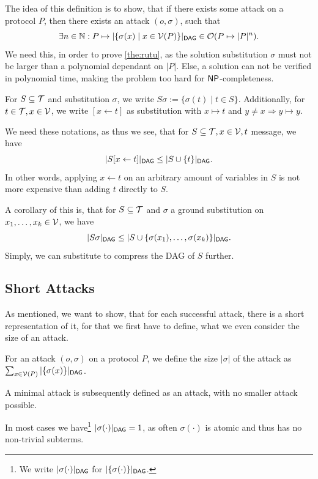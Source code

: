 The idea of this definition is to show, that if there exists some attack on a protocol \(P\), then there exists an attack \((o, \sigma)\), such that
\[\exists n \in \mathbb N : P \mapsto |\{\sigma(x) \mid x \in \mathcal{V}(P)\}|_{\textsf{DAG}} \in \mathcal O(P \mapsto |P|^n).\]
We need this, in order to prove \cref{the:rutu}, as the solution substitution \(\sigma\) must not be larger than a polynomial dependant on \(|P|\).
Else, a solution can not be verified in polynomial time, making the problem too hard for \(\textsf{NP}\)-completeness.

\begin{definition}
    For \(S \subseteq \mathcal{T}\) and substitution \(\sigma\), we write \(S\sigma := \{\sigma(t) \mid t \in S\}\).
    Additionally, for \(t \in \mathcal{T}, x \in \mathcal{V}\), we write \([x \leftarrow t]\) as substitution with \(x \mapsto t\) and \(y \ne x \Rightarrow y \mapsto y\).
\end{definition}

We need these notations, as thus we see, that for \(S \subseteq \mathcal{T}, x \in \mathcal{V}, t\) message, we have
\[|S[x \leftarrow t]|_{\textsf{DAG}} \le |S \cup \{t\}|_{\textsf{DAG}}.\]
In other words, applying \(x \leftarrow t\) on an arbitrary amount of variables in \(S\) is not more expensive than adding \(t\) directly to \(S\).

A corollary of this is, that for \(S \subseteq \mathcal{T}\) and \(\sigma\) a ground substitution on \(x_1, \dots, x_k \in \mathcal{V}\), we have
\[|S\sigma|_{\textsf{DAG}} \le |S \cup \{\sigma(x_1), \dots, \sigma(x_k)\}|_{\textsf{DAG}}.\]
Simply, we can substitute to compress the DAG of \(S\) further.

\subsection{Short Attacks}
As mentioned, we want to show, that for each successful attack, there is a short representation of it, for that we first have to define, what we even consider the size of an attack.

\begin{definition}
    For an attack \((o, \sigma)\) on a protocol \(P\), we define the size \(|\sigma|\) of the attack as \(\sum_{x \in \mathcal{V}(P)}|\{\sigma(x)\}|_{\textsf{DAG}}\).

    A minimal attack is subsequently defined as an attack, with no smaller attack possible.
\end{definition}

In most cases we have\footnote{We write \(|\sigma(\cdot)|_{\textsf{DAG}}\) for \(|\{\sigma(\cdot)\}|_{\textsf{DAG}}\).} \(|\sigma(\cdot)|_{\textsf{DAG}} = 1\), as often \(\sigma(\cdot)\) is atomic and thus has no non-trivial subterms.

